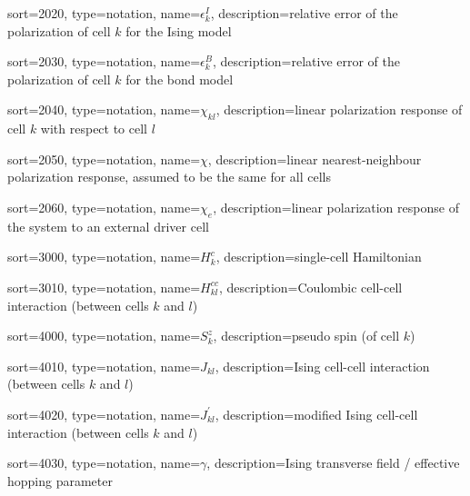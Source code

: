 {
  sort=2020,
  type=notation,
  name={\ensuremath{\epsilon^I_k}},
  description={relative error of the polarization of cell $k$ for the Ising
  model}
}

{
  sort=2030,
  type=notation,
  name={\ensuremath{\epsilon^B_k}},
  description={relative error of the polarization of cell $k$ for the bond
  model}
}

{
  sort=2040,
  type=notation,
  name={\ensuremath{\chi_{kl}}},
  description={linear polarization response of cell $k$ with respect to cell $l$}
}

{
  sort=2050,
  type=notation,
  name={\ensuremath{\chi}},
  description={linear nearest-neighbour polarization response, assumed to be the
  same for all cells}
}

{
  sort=2060,
  type=notation,
  name={\ensuremath{\chi_e}},
  description={linear polarization response of the system to an external driver
  cell}
}

{
  sort=3000,
  type=notation,
  name={\ensuremath{H^c_k}},
  description={single-cell Hamiltonian}
}

{
  sort=3010,
  type=notation,
  name={\ensuremath{H^{cc}_{kl}}},
  description={Coulombic cell-cell interaction (between cells $k$ and $l$)}
}

{
  sort=4000,
  type=notation,
  name={\ensuremath{S^z_k}},
  description={pseudo spin (of cell $k$)}
}

{
  sort=4010,
  type=notation,
  name={\ensuremath{J_{kl}}},
  description={Ising cell-cell interaction (between cells $k$ and $l$)}
}

{
  sort=4020,
  type=notation,
  name={\ensuremath{J^{\prime}_{kl}}},
  description={modified Ising cell-cell interaction (between cells $k$ and $l$)}
}

{
  sort=4030,
  type=notation,
  name={\ensuremath{\gamma}},
  description={Ising transverse field / effective hopping parameter}
}

\glsaddall

